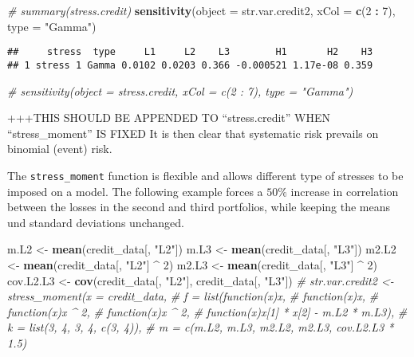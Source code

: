 \documentclass[]{article}
\newenvironment{Shaded}{\begin{snugshade}}{\end{snugshade}}
\newcommand{\CommentTok}[1]{\textcolor[rgb]{0.56,0.35,0.01}{\textit{#1}}}
\newcommand{\DataTypeTok}[1]{\textcolor[rgb]{0.13,0.29,0.53}{#1}}
\newcommand{\DecValTok}[1]{\textcolor[rgb]{0.00,0.00,0.81}{#1}}
\newcommand{\KeywordTok}[1]{\textcolor[rgb]{0.13,0.29,0.53}{\textbf{#1}}}
\newcommand{\NormalTok}[1]{#1}
\newcommand{\OperatorTok}[1]{\textcolor[rgb]{0.81,0.36,0.00}{\textbf{#1}}}
\newcommand{\StringTok}[1]{\textcolor[rgb]{0.31,0.60,0.02}{#1}}
\begin{document}
\begin{Shaded}
\begin{Highlighting}[]
\CommentTok{# summary(stress.credit)}
\KeywordTok{sensitivity}\NormalTok{(}\DataTypeTok{object =}\NormalTok{ str.var.credit2, }\DataTypeTok{xCol =} \KeywordTok{c}\NormalTok{(}\DecValTok{2} \OperatorTok{:}\StringTok{ }\DecValTok{7}\NormalTok{), }\DataTypeTok{type =} \StringTok{"Gamma"}\NormalTok{)}
\end{Highlighting}
\end{Shaded}

\begin{verbatim}
##     stress  type     L1     L2    L3        H1       H2    H3
## 1 stress 1 Gamma 0.0102 0.0203 0.366 -0.000521 1.17e-08 0.359
\end{verbatim}

\begin{Shaded}
\begin{Highlighting}[]
\CommentTok{# sensitivity(object = stress.credit, xCol = c(2 : 7), type = "Gamma")}
\end{Highlighting}
\end{Shaded}

+++THIS SHOULD BE APPENDED TO ``stress.credit'' WHEN ``stress\_moment'' IS FIXED
It is then clear that systematic risk prevails on binomial (event) risk.

The \texttt{stress\_moment} function is flexible and allows different type of stresses to be imposed on a model. The following example forces a \(50\%\) increase in correlation between the losses in the second and third portfolios, while keeping the means und standard deviations unchanged.

\begin{Shaded}
\begin{Highlighting}[]
\NormalTok{m.L2 <-}\StringTok{ }\KeywordTok{mean}\NormalTok{(credit_data[, }\StringTok{"L2"}\NormalTok{])}
\NormalTok{m.L3 <-}\StringTok{ }\KeywordTok{mean}\NormalTok{(credit_data[, }\StringTok{"L3"}\NormalTok{])}
\NormalTok{m2.L2 <-}\StringTok{ }\KeywordTok{mean}\NormalTok{(credit_data[, }\StringTok{"L2"}\NormalTok{] }\OperatorTok{^}\StringTok{ }\DecValTok{2}\NormalTok{)}
\NormalTok{m2.L3 <-}\StringTok{ }\KeywordTok{mean}\NormalTok{(credit_data[, }\StringTok{"L3"}\NormalTok{] }\OperatorTok{^}\StringTok{ }\DecValTok{2}\NormalTok{)}
\NormalTok{cov.L2.L3 <-}\StringTok{ }\KeywordTok{cov}\NormalTok{(credit_data[, }\StringTok{"L2"}\NormalTok{], credit_data[, }\StringTok{"L3"}\NormalTok{])}
\CommentTok{# str.var.credit2 <- stress_moment(x = credit_data,}
\CommentTok{#                                 f = list(function(x)x,}
\CommentTok{#                                          function(x)x,}
\CommentTok{#                                          function(x)x ^ 2,}
\CommentTok{#                                          function(x)x ^ 2,}
\CommentTok{#                                          function(x)x[1] * x[2] - m.L2 * m.L3),}
\CommentTok{#                                 k = list(3, 4, 3, 4, c(3, 4)),}
\CommentTok{#                                 m = c(m.L2, m.L3, m2.L2, m2.L3, cov.L2.L3 * 1.5)}
\end{Highlighting}
\end{Shaded}
\end{document}
